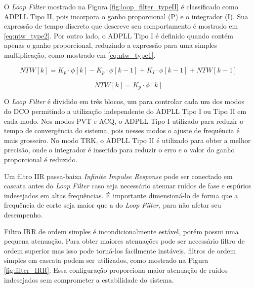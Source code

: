  O \textit{Loop Filter} mostrado na Figura \ref{fig:loop_filter_typeII} é classificado  como ADPLL Tipo II, pois incorpora  o ganho proporcional (P) e o integrador (I). Sua expressão de tempo discreto que descreve seu comportamento é mostrado em \ref{eq:ntw_type2}. Por outro lado, o ADPLL Tipo I é definido quando contém apenas o ganho proporcional,  reduzindo a expressão para uma simples multiplicação, como mostrado em \ref{eq:ntw_type1}.
 
 \begin{equation}
 	NTW[k]= K_p \cdot \phi [k] - K_p \cdot \phi [k -1] + K_I \cdot \phi [k-1] + NTW[k-1]
 	\label{eq:ntw_type2}
 \end{equation}
 
 \begin{equation}
 	NTW[k]= K_p \cdot \phi [k] 
 	\label{eq:ntw_type1}
 \end{equation}
 
 
 
 O \textit{Loop Filter} é dividido em três blocos, um para controlar cada um dos modos do DCO  permitindo a utilização independente do ADPLL Tipo I ou Tipo II em cada modo. Nos modos PVT e ACQ, o ADPLL Tipo I utilizado para reduzir o tempo de convergência do sistema, pois nesses modos o ajuste de frequência é mais grosseiro. No modo TRK, o ADPLL Tipo II é utilizado para obter a melhor precisão, onde o integrador é inserido para reduzir o erro e o valor do ganho proporcional é reduzido.
 
 Um filtro IIR passa-baixa \textit{Infinite Impulse  Response} pode ser conectado em cascata antes do \textit{Loop Filter} caso seja necessário  atenuar ruídos de fase e espúrios indesejados em altas frequências. É importante dimensioná-lo de forma que a frequência de corte seja maior que a do \textit{Loop Filter}, para não afetar seu desempenho.
 
 
Filtro IRR de ordem simples é incondicionalmente estável, porém possui uma pequena atenuação. Para obter maiores atenuações pode ser necessário filtro de ordem superior
mas isso pode torná-los facilmente instáveis. filtros de ordem simples em cascata podem ser utilizados, como mostrado na Figura \ref{fig:filter_IRR}. Essa configuração proporciona maior atenuação de ruídos indesejados sem comprometer a estabilidade do sistema.

